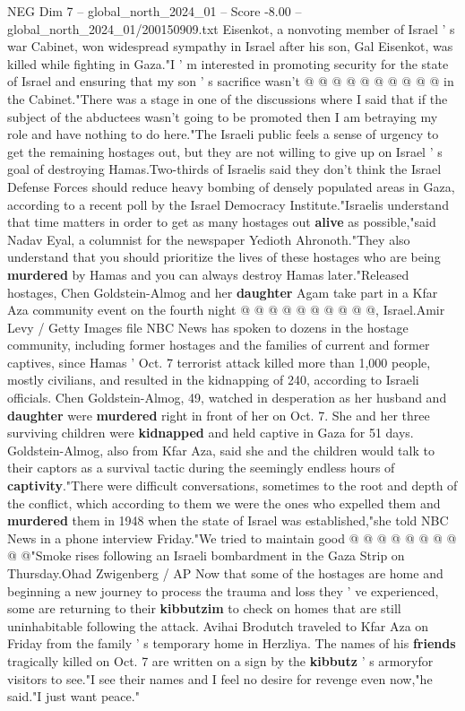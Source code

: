 \begin{textsample}{NEG Dim 7 – global\_north\_2024\_01 – Score -8.00 – global\_north\_2024\_01/200150909.txt}
Eisenkot, a nonvoting member of Israel ' s war Cabinet, won widespread sympathy in Israel after his son, Gal Eisenkot, was killed while fighting in Gaza."I ' m interested in promoting security for the state of Israel and ensuring that my son ' s sacrifice wasn't @ @ @ @ @ @ @ @ @ @ in the Cabinet."There was a stage in one of the discussions where I said that if the subject of the abductees wasn't going to be promoted then I am betraying my role and have nothing to do here."The Israeli public feels a sense of urgency to get the remaining hostages out, but they are not willing to give up on Israel ' s goal of destroying Hamas.Two-thirds of Israelis said they don't think the Israel Defense Forces should reduce heavy bombing of densely populated areas in Gaza, according to a recent poll by the Israel Democracy Institute."Israelis understand that time matters in order to get as many hostages out \textbf{alive} as possible,"said Nadav Eyal, a columnist for the newspaper Yedioth Ahronoth."They also understand that you should prioritize the lives of these hostages who are being \textbf{murdered} by Hamas and you can always destroy Hamas later."Released hostages, Chen Goldstein-Almog and her \textbf{daughter} Agam take part in a Kfar Aza community event on the fourth night @ @ @ @ @ @ @ @ @ @, Israel.Amir Levy / Getty Images file NBC News has spoken to dozens in the hostage community, including former hostages and the families of current and former captives, since Hamas ' Oct. 7 terrorist attack killed more than 1,000 people, mostly civilians, and resulted in the kidnapping of 240, according to Israeli officials.
Chen Goldstein-Almog, 49, watched in desperation as her husband and \textbf{daughter} were \textbf{murdered} right in front of her on Oct. 7.
She and her three surviving children were \textbf{kidnapped} and held captive in Gaza for 51 days.
Goldstein-Almog, also from Kfar Aza, said she and the children would talk to their captors as a survival tactic during the seemingly endless hours of \textbf{captivity}."There were difficult conversations, sometimes to the root and depth of the conflict, which according to them we were the ones who expelled them and \textbf{murdered} them in 1948 when the state of Israel was established,"she told NBC News in a phone interview Friday."We tried to maintain good @ @ @ @ @ @ @ @ @ @"Smoke rises following an Israeli bombardment in the Gaza Strip on Thursday.Ohad Zwigenberg / AP Now that some of the hostages are home and beginning a new journey to process the trauma and loss they ' ve experienced, some are returning to their \textbf{kibbutzim} to check on homes that are still uninhabitable following the attack.
Avihai Brodutch traveled to Kfar Aza on Friday from the family ' s temporary home in Herzliya.
The names of his \textbf{friends} tragically killed on Oct. 7 are written on a sign by the \textbf{kibbutz} ' s armoryfor visitors to see."I see their names and I feel no desire for revenge even now,"he said."I just want peace."

\end{textsample}
